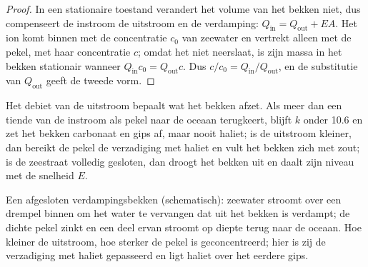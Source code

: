 \begin{proof}
In een stationaire toestand verandert het volume van het bekken niet, dus compenseert de instroom de uitstroom en de verdamping: $Q_{\mathrm{in}} = Q_{\mathrm{out}} +
EA$. Het ion komt binnen met de concentratie $c_0$ van zeewater en vertrekt alleen met de pekel, met haar concentratie $c$; omdat het niet neerslaat, is zijn massa in het bekken stationair wanneer $Q_{\mathrm{in}}c_0 = Q_{\mathrm{out}}c$. Dus $c/c_0 =
Q_{\mathrm{in}}/Q_{\mathrm{out}}$, en de substitutie van $Q_{\mathrm{out}}$ geeft de tweede vorm.
\end{proof}

Het debiet van de uitstroom bepaalt wat het bekken afzet. Als meer dan een tiende van de instroom als pekel naar de oceaan terugkeert, blijft $k$ onder 10.6 en zet het bekken carbonaat en gips af, maar nooit haliet; is de uitstroom kleiner, dan bereikt de pekel de verzadiging met haliet en vult het bekken zich met zout; is de zeestraat volledig gesloten, dan droogt het bekken uit en daalt zijn niveau met de snelheid $E$.

\begin{omfigure}

{\small Een afgesloten verdampingsbekken (schematisch): zeewater stroomt over een drempel binnen om het water te vervangen dat uit het bekken is verdampt; de dichte pekel zinkt en een deel ervan stroomt op diepte terug naar de oceaan. Hoe kleiner de uitstroom, hoe sterker de pekel is geconcentreerd; hier is zij de verzadiging met haliet gepasseerd en ligt haliet over het eerdere gips.}
\label{fig:b1:chemical-biogenic-sediments:barred}
\end{omfigure}

